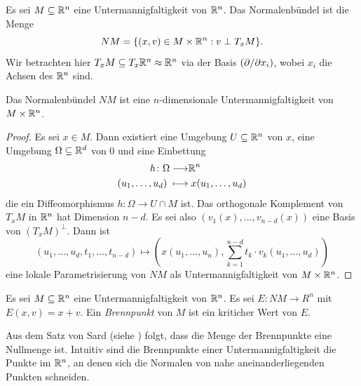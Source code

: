 \begin{definition}[Normalenbündel]
    \label{def: normalenbuendel}
    Es sei $M \subseteq { \mathbb R }^n$ eine Untermannigfaltigkeit von ${ \mathbb R }^n$. Das Normalenbündel ist die 
    Menge
    \[ NM = \{ (x, v) \in M \times { \mathbb R }^n : v \perp T_xM \} . \]
    Wir betrachten hier $T_xM \subseteq T_x{ \mathbb R }^n \approx { \mathbb R }^n$ via der Basis 
    $\left( { \partial } / { \partial } x_i \right)$, wobei $x_i$ die Achsen des ${ \mathbb R }^n$ sind.
\end{definition}

\begin{prop}
    \label{prop: NM ist untermannigfaltigkeit}
    Das Normalenbündel $NM$ ist eine $n$-dimensionale Untermannigfaltigkeit von $M \times { \mathbb R }^n$.
\end{prop}

\begin{proof}
    Es sei $x \in M$. Dann existiert eine Umgebung $U \subseteq { \mathbb R }^n$ von $x$, eine Umgebung 
    $\Omega \subseteq { \mathbb R }^d$ von $0$ und eine Einbettung 
    \begin{align*}
        h \colon \Omega \longrightarrow & { \mathbb R }^n \\
        (u_1, \dots, u_d) \; \longmapsto & \; x(u_1, \dots, u_d)
    \end{align*}
    die ein Diffeomorphismus $h \colon \Omega \to U \cap M$ ist. Das orthogonale Komplement 
    von $T_xM$ in ${ \mathbb R }^n$ hat Dimension $n - d$. Es sei also 
    $(v_1(x), ..., v_{n-d}(x))$ eine Basis von $(T_xM)^{\perp}$. Dann ist 
    \[ (u_1, ..., u_d, t_1, ..., t_{n - d}) \longmapsto 
        \left(x(u_1, ..., u_n), \sum_{k = 1}^{n - d} t_k \cdot v_k(u_1, ..., u_d)\right) \]
    eine lokale Parametrisierung von $NM$ als Untermannigfaltigkeit von $M \times { \mathbb R }^n$.
\end{proof}

\begin{definition}[Brennpunkt]
    \label{def: brennpunkt}
    Es sei $M \subseteq { \mathbb R }^n$ eine Untermannigfaltigkeit von ${ \mathbb R }^n$. Es sei $E \colon NM \to R^n$ 
    mit $E (x, v) = x + v$. Ein \textit{Brennpunkt} von $M$ ist ein kriticher Wert von $E$.
\end{definition}

\begin{remark}
    Aus dem Satz von Sard (siehe \cite{sard}) folgt, dass die Menge der Brennpunkte eine 
    Nullmenge ist. Intuitiv sind die Brennpunkte einer Untermannigfaltigkeit die Punkte im 
    ${ \mathbb R }^n$, an denen sich die Normalen von nahe aneinanderliegenden Punkten schneiden.
\end{remark}

